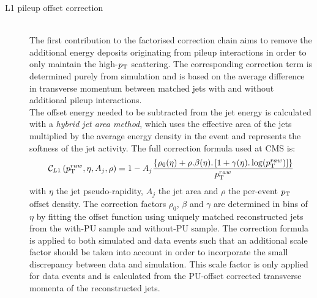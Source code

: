 \begin{myindentpar}
  \begin{description}
    \item[L1 pileup offset correction] \hfill \\
    The first contribution to the factorised correction chain aims to remove the additional energy deposits originating from pileup interactions in order to only maintain the high-$p_{\rm T}$ scattering. The corresponding correction term is determined purely from simulation and is based on the average difference in transverse momentum between matched jets with and without additional pileup interactions.
    \\
    
    \indPar The offset energy needed to be subtracted from the jet energy is calculated with a \textit{hybrid jet area method}, which uses the effective area of the jets multiplied by the average energy density in the event and represents the softness of the jet activity. The full correction formula used at CMS is:    
    \begin{equation}
     \mathcal{C}_{L1}\left(p_{\rm T}^{raw}, \eta, A_{j}, \rho \right) = 1 - A_{j} \dfrac{\left\lbrace \rho_{0}(\eta) + \rho . \beta(\eta) . \left[ 1 + \gamma(\eta).\log(p_{\rm T}^{raw}) \right] \right\rbrace}{p_{\rm T}^{raw}}
    \end{equation}
    with $\eta$ the jet pseudo-rapidity, $A_{j}$ the jet area and $\rho$ the per-event $p_{\rm T}$ offset density. 
    The correction factors $\rho_{0}$, $\beta$ and $\gamma$ are determined in bins of $\eta$ by fitting the offset function using uniquely matched reconstructed jets from the with-PU sample and without-PU sample. 
    The correction formula is applied to both simulated and data events such that an additional scale factor should be taken into account in order to incorporate the small discrepancy between data and simulation.
    This scale factor is only applied for data events and is calculated from the PU-offset corrected transverse momenta of the reconstructed jets.
    

\end{description}
\end{myindentpar}
